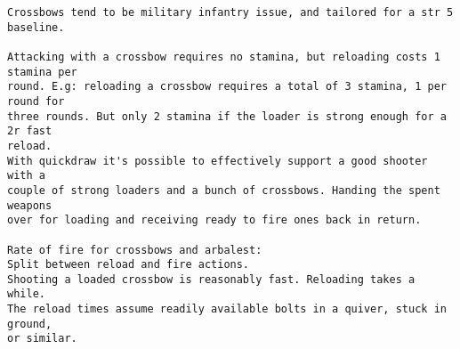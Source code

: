 \goodbreak \small \begin{samepage} \begin{verbatim}
Crossbows tend to be military infantry issue, and tailored for a str 5 baseline.

Attacking with a crossbow requires no stamina, but reloading costs 1 stamina per
round. E.g: reloading a crossbow requires a total of 3 stamina, 1 per round for
three rounds. But only 2 stamina if the loader is strong enough for a 2r fast
reload.
With quickdraw it's possible to effectively support a good shooter with a
couple of strong loaders and a bunch of crossbows. Handing the spent weapons
over for loading and receiving ready to fire ones back in return.

Rate of fire for crossbows and arbalest:
Split between reload and fire actions.
Shooting a loaded crossbow is reasonably fast. Reloading takes a while.
The reload times assume readily available bolts in a quiver, stuck in ground,
or similar.


\end{verbatim}
\end{samepage}
